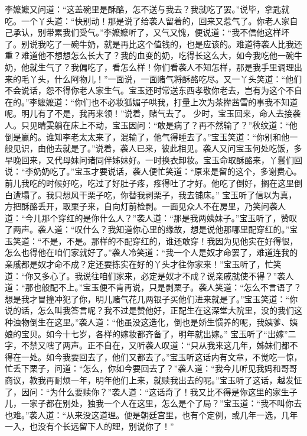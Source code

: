 \documentclass[12pt,oneside]{book}
\begin{document}
李嬷嬷又问道：“这盖碗里是酥酪，怎不送与我去？我就吃了罢。”说毕，拿匙就吃。一个丫头道：“快别动！那是说了给袭人留着的，回来又惹气了。你老人家自己承认，别带累我们受气。”李嬷嬷听了，又气又愧，便说道：“我不信他这样坏了。别说我吃了一碗牛奶，就是再比这个值钱的，也是应该的。难道待袭人比我还重？难道他不想想怎么长大了？我的血变的奶，吃得长这么大，如今我吃他一碗牛奶，他就生气了？我偏吃了，看怎么样！你们看袭人不知怎样，那是我手里调理出来的毛丫头，什么阿物儿！”一面说，一面赌气将酥酪吃尽。又一丫头笑道：“他们不会说话，怨不得你老人家生气。宝玉还时常送东西孝敬你老去，岂有为这个不自在的。”李嬷嬷道：“你们也不必妆狐媚子哄我，打量上次为茶撵茜雪的事我不知道呢。明儿有了不是，我再来领！”说着，赌气去了。
少时，宝玉回来，命人去接袭人。只见晴雯躺在床上不动，宝玉因问：“敢是病了？再不然输了？”秋纹道：“他倒是赢的。谁知李老太太来了，混输了，他气得睡去了。”宝玉笑道：“你别和他一般见识，由他去就是了。”说着，袭人已来，彼此相见。袭人又问宝玉何处吃饭，多早晚回来，又代母妹问诸同伴姊妹好。一时换衣卸妆。宝玉命取酥酪来，丫鬟们回说：“李奶奶吃了。”宝玉才要说话，袭人便忙笑道：“原来是留的这个，多谢费心。前儿我吃的时候好吃，吃过了好肚子疼，疼得吐了才好。他吃了倒好，搁在这里倒白遭塌了。我只想风干栗子吃，你替我剥栗子，我去铺床。”
宝玉听了信以为真，方把酥酪丢开，取栗子来，自向灯前检剥。一面见众人不在房里，乃笑问袭人道：“今儿那个穿红的是你什么人？”袭人道：“那是我两姨妹子。”宝玉听了，赞叹了两声。袭人道：“叹什么？我知道你心里的缘故，想是说他那哪里配穿红的。”宝玉笑道：“不是，不是。那样的不配穿红的，谁还敢穿！我因为见他实在好得很，怎么也得他在咱们家就好了。”袭人冷笑道：“我一个人是奴才命罢了，难道连我的亲戚都是奴才命不成？定还要拣实在好的丫头才往你家来！”宝玉听了，忙笑道：“你又多心了。我说往咱们家来，必定是奴才不成？说亲戚就使不得？”袭人道：“那也般配不上。”宝玉便不肯再说，只是剥栗子。袭人笑道：“怎么不言语了？想是我才冒撞冲犯了你，明儿赌气花几两银子买他们进来就是了。”宝玉笑道：“你说的话，怎么叫我答言呢？我不过是赞他好，正配生在这深堂大院里，没的我们这种浊物倒生在这里。”袭人道：“他虽没这造化，倒也是娇生惯养的呢，我姨爹、姨娘的宝贝。如今十七岁，各样的嫁妆都齐备了，明年就出嫁。”
宝玉听了“出嫁”二字，不禁又嗐了两声。正不自在，又听袭人叹道：“只从我来这几年，姊妹们都不得在一处。如今我要回去了，他们又都去了。”宝玉听这话内有文章，不觉吃一惊，忙丢下栗子，问道：“怎么，你如今要回去了？”袭人道：“我今儿听见我妈和哥哥商议，教我再耐烦一年，明年他们上来，就赎我出去的呢。”宝玉听了这话，越发怔了，因问：“为什么要赎你？”袭人道：“这话奇了！我又比不得是你这里的家生子儿，一家子都在别处，独我一个人在这里，怎么是个了局？”宝玉道：“我不叫你去也难。”袭人道：“从来没这道理。便是朝廷宫里，也有个定例，或几年一选，几年一入，也没有个长远留下人的理，别说你了！”
\end{document}
